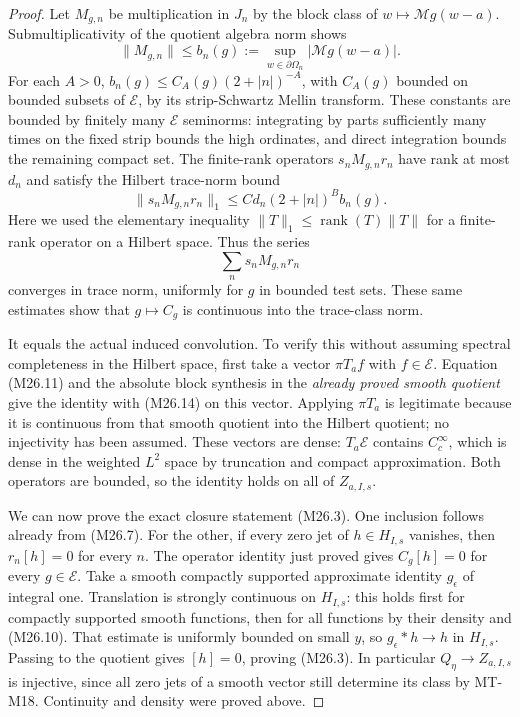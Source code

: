 \begin{proof}
Let $M_{g,n}$ be multiplication in $J_n$ by the block class
of $w\mapsto\mathcal Mg(w-a)$. Submultiplicativity of the
quotient algebra norm shows
\[
 \|M_{g,n}\|\le b_n(g):=
       \sup_{w\in\partial\Omega_n}|\mathcal Mg(w-a)|.
                                                               \tag{M26.12}
\]
For each $A>0$, $b_n(g)\le C_A(g)(2+|n|)^{-A}$,
with $C_A(g)$ bounded on bounded subsets of $\mathcal E$,
by its strip-Schwartz Mellin transform. These constants
are bounded by finitely many $\mathcal E$ seminorms:
integrating by parts sufficiently many times on the
fixed strip bounds the high ordinates, and direct
integration bounds the remaining compact set. The finite-rank
operators $s_nM_{g,n}r_n$ have rank at most $d_n$ and
satisfy the Hilbert trace-norm bound
\[
 \|s_nM_{g,n}r_n\|_1
       \le C d_n(2+|n|)^B b_n(g).
                                                               \tag{M26.13}
\]
Here we used the elementary inequality
$\|T\|_1\le\operatorname{rank}(T)\|T\|$ for a finite-rank
operator on a Hilbert space. Thus the series
\[
                     \sum_n s_nM_{g,n}r_n
                                                               \tag{M26.14}
\]
converges in trace norm, uniformly for $g$ in bounded test
sets. These same estimates show that
$g\mapsto C_g$ is continuous into the trace-class norm.

It equals the actual induced convolution. To verify this
without assuming spectral completeness in the Hilbert
space, first take a vector $\pi T_af$ with $f\in\mathcal E$.
Equation (M26.11) and the absolute block synthesis in the
\emph{already proved smooth quotient} give the identity
with (M26.14) on this vector. Applying $\pi T_a$ is
legitimate because it is continuous from that smooth
quotient into the Hilbert quotient; no injectivity has
been assumed. These vectors are dense: $T_a\mathcal E$
contains $C_c^\infty$, which is dense in the weighted
$L^2$ space by truncation and compact approximation.
Both operators are bounded, so the identity holds on
all of $Z_{a,I,s}$.

We can now prove the exact closure statement (M26.3).
One inclusion follows already from (M26.7). For the other,
if every zero jet of $h\in H_{I,s}$ vanishes, then
$r_n[ h ]=0$ for every $n$. The operator identity just
proved gives $C_g[h]=0$ for every $g\in\mathcal E$.
Take a smooth compactly supported approximate identity
$g_\epsilon$ of integral one. Translation is strongly
continuous on $H_{I,s}$: this holds first for compactly
supported smooth functions, then for all functions by
their density and (M26.10). That estimate is uniformly
bounded on small $y$, so
$g_\epsilon*h\to h$ in $H_{I,s}$.
Passing to the quotient gives $[h]=0$, proving (M26.3).
In particular $Q_\eta\to Z_{a,I,s}$ is injective, since
all zero jets of a smooth vector still determine its
class by MT-M18. Continuity and density were proved above.


\end{proof}
